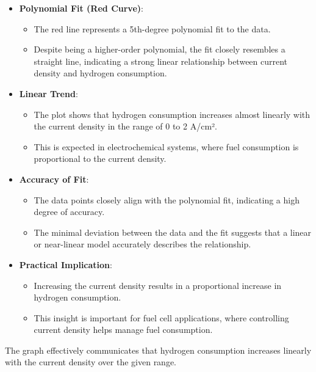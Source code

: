 \documentclass[12pt,a4paper]{article}
\numberwithin{equation}{section}
\begin{document}
{\begin{itemize}
	\item \textbf{Polynomial Fit (Red Curve)}:
	\begin{itemize}
		\item The red line represents a 5th-degree polynomial fit to the data.
		\item Despite being a higher-order polynomial, the fit closely resembles a straight line, indicating a strong linear relationship between current density and hydrogen consumption.
	\end{itemize}
	
	\item \textbf{Linear Trend}:
	\begin{itemize}
		\item The plot shows that hydrogen consumption increases almost linearly with the current density in the range of 0 to 2 A/cm².
		\item This is expected in electrochemical systems, where fuel consumption is proportional to the current density.
	\end{itemize}
	
	\item \textbf{Accuracy of Fit}:
	\begin{itemize}
		\item The data points closely align with the polynomial fit, indicating a high degree of accuracy.
		\item The minimal deviation between the data and the fit suggests that a linear or near-linear model accurately describes the relationship.
	\end{itemize}
	
	\item \textbf{Practical Implication}:
	\begin{itemize}
		\item Increasing the current density results in a proportional increase in hydrogen consumption.
		\item This insight is important for fuel cell applications, where controlling current density helps manage fuel consumption.
	\end{itemize}
	
\end{itemize}

The graph effectively communicates that hydrogen consumption increases linearly with the current density over the given range.




}
\end{document}

